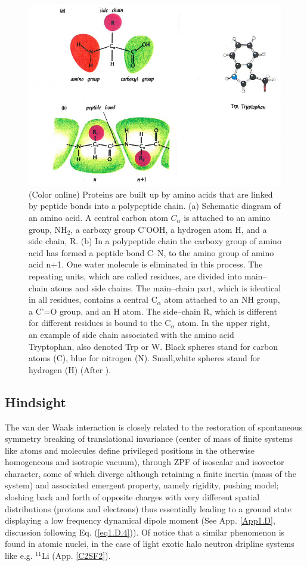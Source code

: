 \begin{subappendices}
 \begin{figure}[h!]
 	\centerline{\includegraphics*[width=15cm,angle=0]{nutshell/figs/fig2D7.pdf}}
 	\caption{(Color online) Proteins are built up by amino acids that are linked by peptide bonds into a polypeptide chain. (a) Schematic diagram of an amino acid. A central carbon atom $C_\alpha$ is attached to an amino group, NH$_2$, a carboxy group C'OOH, a hydrogen atom H, and a side chain, R. (b) In a polypeptide chain the carboxy group of amino acid has formed a peptide bond C--N, to the amino group of amino acid n+1. One water molecule is eliminated in this process. The repeating units, which are called residues, are divided into main--chain atoms and side chains. The main--chain part, which is identical in all residues, contains a central C$_\alpha$ atom attached to an NH group, a C'=O group, and an H atom. The side--chain R, which is different for different residues is bound to the C$_\alpha$ atom. In the upper right, an example of side chain associated with the amino acid Tryptophan, also denoted Trp or W. Black spheres stand for carbon atoms (C), blue for nitrogen (N). Small,white spheres stand for hydrogen (H) (After \cite{Branden:91}).}\label{fig2.D.7}
 \end{figure}
\newpage
 \subsection*{Hindsight}
 The van der Waals interaction is closely related to the restoration of spontaneous symmetry breaking of translational invariance (center of mass of finite systems like atoms and molecules define privileged positions in the otherwise homogeneous and isotropic vacuum), through ZPF of isoscalar and isovector character, some of which diverge although retaining a finite inertia (mass of the system) and associated emergent property, namely rigidity, pushing model; sloshing back and forth of opposite charges with very different spatial distributions (protons and electrons) thus essentially leading to a ground state displaying a low frequency dynamical dipole moment (See App. \ref{App1.D}, discussion following Eq. (\ref{eq1.D.4})). Of notice that a similar phenomenon is found in atomic nuclei, in the case of light exotic halo neutron dripline systems like e.g. $^{11}$Li (App. \ref{C2SF2}).


\end{subappendices}
